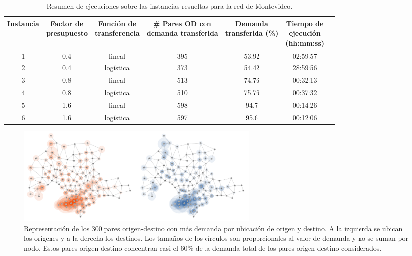 \begin{table}[h!]
  \centering
  \begin{adjustbox}{width=1.2\textwidth,center=\textwidth}
    \begin{tabular}{ccccccc}
      \toprule
        Instancia & \shortstack{Factor de \\ presupuesto} & \shortstack{Función de \\ transferencia} & \shortstack{\# Pares OD con \\ demanda transferida} & \shortstack{Demanda \\ transferida (\%)} & \shortstack{Tiempo de \\ ejecución \\ (hh:mm:ss)} \\
      \midrule
        1 & 0.4 & lineal & 395 & 53.92 & 02:59:57 \\
        2 & 0.4 & logística & 373 & 54.42 & 28:59:56 \\
        3 & 0.8 & lineal & 513 & 74.76 & 00:32:13 \\
        4 & 0.8 & logística & 510 & 75.76 & 00:37:32 \\
        5 & 1.6 & lineal & 598 & 94.7 & 00:14:26 \\
        6 & 1.6 & logística & 597 & 95.6 & 00:12:06 \\
      \bottomrule
    \end{tabular}
  \end{adjustbox}
  \caption{Resumen de ejecuciones sobre las instancias resueltas para la red de Montevideo.}\label{table:montevideoexecutions}
\end{table}

\begin{figure}[h!]
  \centering
  \includegraphics[width=12cm]{../resources/montevideo_demands.png}
    \caption{Representación de los 300 pares origen-destino con más demanda por ubicación de origen y destino. A la izquierda se ubican los orígenes y a la derecha los destinos. Los tamaños de los círculos son proporcionales al valor de demanda y no se suman por nodo. Estos pares origen-destino concentran casi el 60\% de la demanda total de los pares origen-destino considerados.}
  \label{fig:montevideodemanddist}
\end{figure}

